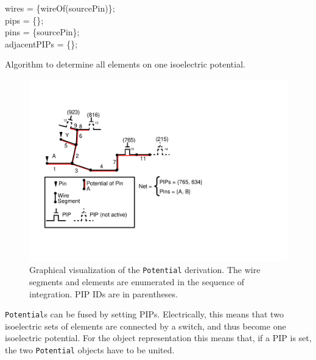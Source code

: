 \begin{algorithm}[h]
	wires = \{wireOf(sourcePin)\};\\
	pips = \{\};\\
	pins = \{sourcePin\};\\
	adjacentPIPs = \{\};\\
 \caption{Algorithm to determine all elements on one isoelectric potential.}
 \label{alg:findingpotential}
\end{algorithm}

\begin{figure}
\centering
\includegraphics[scale=0.8]{images/buildpotential_buildup.pdf}
\caption{Graphical visualization of the \texttt{Potential} derivation. The wire segments and elements are enumerated in the sequence of integration. PIP IDs are in parentheses.}
\label{fig:buildpotential}
\end{figure}



\texttt{Potential}s can be fused by setting PIPs. Electrically, this means that two isoelectric sets of elements are connected by a switch, and thus become one isoelectric potential. For the object representation this means that, if a PIP is set, the two \texttt{Potential} objects have to be united.

